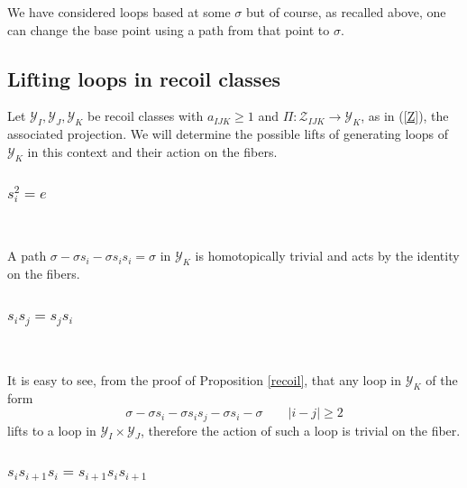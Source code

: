\documentclass[11pt,a4paper]{amsart}
\theoremstyle{contraction}
\begin{document}
 We have considered loops based at some $\sigma$ but of course, as recalled above,  one can change the base point using a path from that point to $\sigma$.

  
 \subsection{Lifting loops in recoil classes}Let ${\mathcal Y}_I, {\mathcal Y}_J, {\mathcal Y}_K$ be recoil classes with $a_{IJK}\geq 1$ and $\Pi:{\mathcal Z}_{IJK}\to {\mathcal Y}_K$, as in (\ref{Z}), the associated projection. 
 We will determine the possible lifts of generating loops of
 ${\mathcal Y}_K$ in this context and their action on the fibers.
 
 \subsubsection{ $s_i^2=e$}\
 
 
 
 A path $\sigma-\sigma s_i-\sigma s_is_i=\sigma$ in ${\mathcal Y}_K$   is homotopically trivial and acts by the identity on the fibers.
\subsubsection{$s_is_j=s_js_i$}\

  It is easy to see, from the proof of Proposition \ref{recoil}, that any loop in ${\mathcal Y}_K$ of the form 
   $$\sigma-\sigma s_i-\sigma s_is_j-\sigma s_i-\sigma\qquad |i-j|\geq 2$$   lifts to a loop 
   in ${\mathcal Y}_I\times {\mathcal Y}_J$, therefore the action of such a loop is trivial on the fiber.
\subsubsection{ $s_is_{i+1}s_i=s_{i+1}s_is_{i+1}$}\
\end{document}
